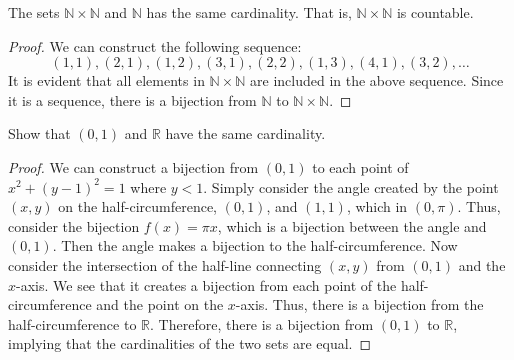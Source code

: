 \documentclass[../main.tex]{subfiles}
\begin{document}
\begin{thm}
    The sets $\mathbb{N} \times \mathbb{N}$ and $\mathbb N$ has the same cardinality.
    That is, $\mathbb{N} \times \mathbb{N}$ is countable.
\end{thm}
\begin{proof}
    We can construct the following sequence:
    \[
        (1,1), (2,1), (1,2), (3,1), (2,2), (1,3), (4,1), (3,2), \dots
    \]
    It is evident that all elements in $\mathbb{N} \times \mathbb{N}$ are included in the above sequence.
    Since it is a sequence, there is a bijection from $\mathbb{N}$ to $\mathbb{N} \times \mathbb{N}$.
\end{proof}

\begin{prob}
    Show that $(0, 1)$ and $\mathbb R$ have the same cardinality.
\end{prob}
\begin{proof}
    We can construct a bijection from $(0, 1)$ to each point of $x^2 + (y-1)^2 = 1$ where $y < 1$.
    Simply consider the angle created by the point $(x, y)$ on the half-circumference, $(0, 1)$, and $(1,1)$, which in $(0, \pi)$.
    Thus, consider the bijection $f(x) = \pi x$, which is a bijection between the angle and $(0, 1)$.
    Then the angle makes a bijection to the half-circumference.
    Now consider the intersection of the half-line connecting $(x, y)$ from $(0,1)$ and the $x$-axis.
    We see that it creates a bijection from each point of the half-circumference and the point on the $x$-axis.
    Thus, there is a bijection from the half-circumference to $\mathbb R$.
    Therefore, there is a bijection from $(0, 1)$ to $\mathbb R$, implying that the cardinalities of the two sets are equal.
\end{proof}
\end{document}
